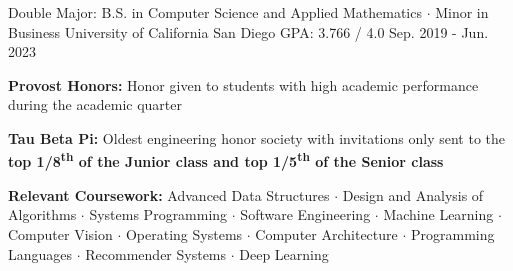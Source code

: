 

\begin{cventries}

  \cventry
    {Double Major: B.S. in Computer Science and Applied Mathematics $\cdot$ Minor in Business} %
    {University of California San Diego} %
    {GPA: 3.766 / 4.0} %
    {Sep. 2019 - Jun. 2023} %
    {
      \begin{cvitems} %
        \item {\textbf{Provost Honors:} Honor given to students with high academic performance during the academic quarter}
        \item {\textbf{Tau Beta Pi:} Oldest engineering honor society with invitations only sent to the \textbf{top 1/8\textsuperscript{th} of the Junior class and top 1/5\textsuperscript{th} of the Senior class}}
        \item {\textbf{Relevant Coursework:} Advanced Data Structures $\cdot$ Design and Analysis of Algorithms $\cdot$ Systems Programming $\cdot$ Software Engineering $\cdot$ Machine Learning $\cdot$ Computer Vision $\cdot$ Operating Systems $\cdot$ Computer Architecture $\cdot$ Programming Languages $\cdot$ Recommender Systems $\cdot$ Deep Learning}
      \end{cvitems}
    }

\end{cventries}
